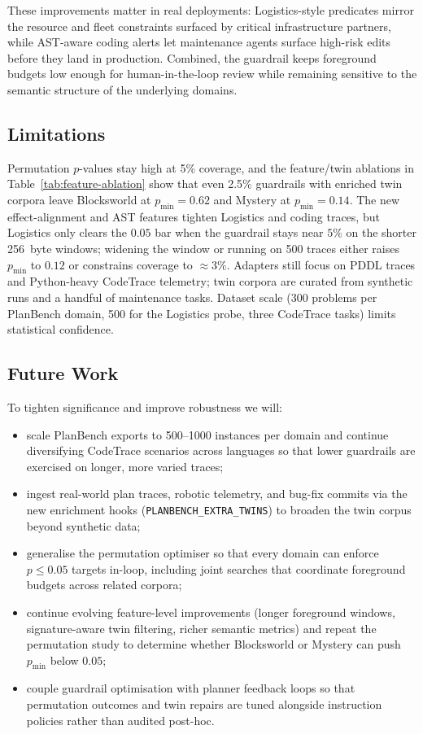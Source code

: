 \documentclass[11pt]{article}
\begin{document}
These improvements matter in real deployments: Logistics-style predicates mirror
the resource and fleet constraints surfaced by critical infrastructure partners,
while AST-aware coding alerts let maintenance agents surface high-risk edits
before they land in production. Combined, the guardrail keeps foreground budgets
low enough for human-in-the-loop review while remaining sensitive to the semantic
structure of the underlying domains.

\subsection{Limitations}
Permutation $p$-values stay high at 5\% coverage, and the feature/twin ablations
in Table~\ref{tab:feature-ablation} show that even 2.5\% guardrails with enriched
twin corpora leave Blocksworld at $p_{\min}=0.62$ and Mystery at $p_{\min}=0.14$.
The new effect-alignment and AST features tighten Logistics and coding traces,
but Logistics only clears the $0.05$ bar when the guardrail stays near $5\%$ on
the shorter 256~byte windows; widening the window or running on 500 traces either
raises $p_{\min}$ to $0.12$ or constrains coverage to $\approx 3\%$. Adapters
still focus on PDDL traces and Python-heavy CodeTrace telemetry; twin corpora are
curated from synthetic runs and a handful of maintenance tasks. Dataset scale
(300 problems per PlanBench domain, 500 for the Logistics probe, three CodeTrace
tasks) limits statistical confidence.

\subsection{Future Work}
To tighten significance and improve robustness we will:
\begin{itemize}
  \item scale PlanBench exports to 500--1000 instances per domain and continue
        diversifying CodeTrace scenarios across languages so that lower
        guardrails are exercised on longer, more varied traces;
  \item ingest real-world plan traces, robotic telemetry, and bug-fix commits
        via the new enrichment hooks (\texttt{PLANBENCH\_EXTRA\_TWINS}) to broaden the
        twin corpus beyond synthetic data;
  \item generalise the permutation optimiser so that every domain can enforce
        $p \le 0.05$ targets in-loop, including joint searches that coordinate
        foreground budgets across related corpora;
  \item continue evolving feature-level improvements (longer foreground windows,
        signature-aware twin filtering, richer semantic metrics) and repeat the
        permutation study to determine whether Blocksworld or Mystery can push
        $p_{\min}$ below $0.05$;
  \item couple guardrail optimisation with planner feedback loops so that
        permutation outcomes and twin repairs are tuned alongside instruction
        policies rather than audited post-hoc.
\end{itemize}
\end{document}
